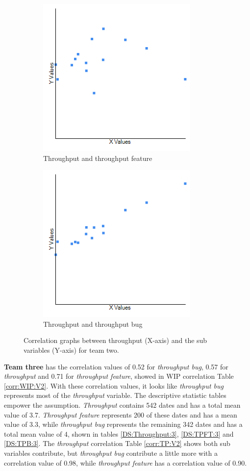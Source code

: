\documentclass[UKenglish]{ifimaster}  %
\begin{document}
\begin{figure}[h] 
  \begin{subfigure}[b]{0.5\textwidth}
  \center
\includegraphics[scale=0.6]{Picture/Two/TPvsTPFT.png}
 \caption{Throughput and throughput feature} 
 \label{fig:a:2}
  \end{subfigure}
  \begin{subfigure}[b]{0.5\textwidth}
  \center
\includegraphics[scale=0.6]{Picture/Two/TPvsTPB.png}
 \caption{Throughput and throughput bug} 
\label{fig:b:2}
  \end{subfigure}
  \caption{Correlation graphs between throughput (X-axis) and the sub variables (Y-axis) for team two.}
\label{corr:Difference:2}
\end{figure}
\newpage


\textbf{Team three} has the correlation values of 0.52 for \textit{throughput bug}, 0.57 for \textit{throughput}  and 0.71 for \textit{throughput feature}, showed in WIP correlation Table \ref{corr:WIP:V2}. With these correlation values, it looks like \textit{throughput bug} represents most of the \textit{throughput} variable. The descriptive statistic tables empower the assumption. \textit{Throughput} contains 542 dates and has a total mean value of 3.7. \textit{Throughput feature} represents 200 of these dates and has a mean value of 3.3, while \textit{throughput bug} represents the remaining 342 dates and has a total mean value of 4,  shown in tables \ref{DS:Throughput:3}, \ref{DS:TPFT:3} and \ref{DS:TPB:3}. The \textit{throughput} correlation Table \ref{corr:TP:V2} shows both sub variables contribute, but \textit{throughput bug} contribute a little more with a correlation value of 0.98, while \textit{throughput feature}  has a correlation value of 0.90.
\end{document}
